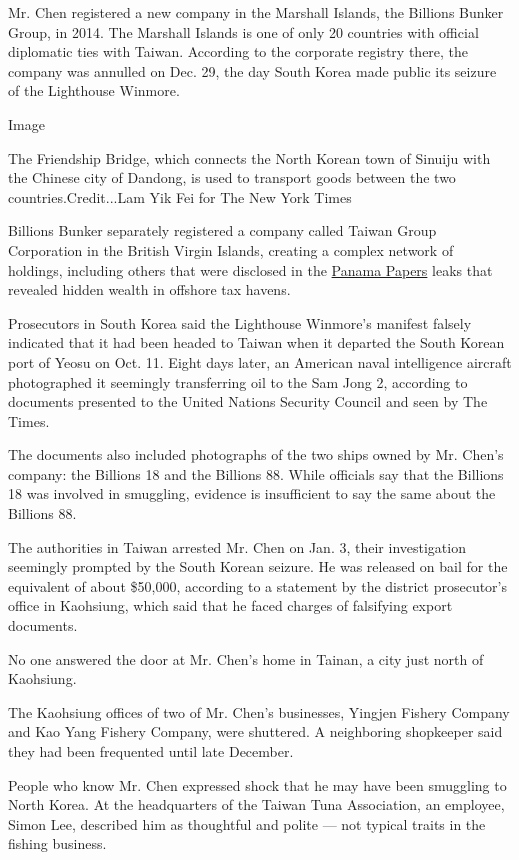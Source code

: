Mr. Chen registered a new company in the Marshall Islands, the Billions
Bunker Group, in 2014. The Marshall Islands is one of only 20 countries
with official diplomatic ties with Taiwan. According to the corporate
registry there, the company was annulled on Dec. 29, the day South Korea
made public its seizure of the Lighthouse Winmore.

Image

The Friendship Bridge, which connects the North Korean town of Sinuiju
with the Chinese city of Dandong, is used to transport goods between the
two countries.Credit...Lam Yik Fei for The New York Times

Billions Bunker separately registered a company called Taiwan Group
Corporation in the British Virgin Islands, creating a complex network of
holdings, including others that were disclosed in the
\href{https://www.nytimes3xbfgragh.onion/2016/04/05/world/panama-papers-explainer.html}{Panama
Papers} leaks that revealed hidden wealth in offshore tax havens.

Prosecutors in South Korea said the Lighthouse Winmore's manifest
falsely indicated that it had been headed to Taiwan when it departed the
South Korean port of Yeosu on Oct. 11. Eight days later, an American
naval intelligence aircraft photographed it seemingly transferring oil
to the Sam Jong 2, according to documents presented to the United
Nations Security Council and seen by The Times.

The documents also included photographs of the two ships owned by Mr.
Chen's company: the Billions 18 and the Billions 88. While officials say
that the Billions 18 was involved in smuggling, evidence is insufficient
to say the same about the Billions 88.

The authorities in Taiwan arrested Mr. Chen on Jan. 3, their
investigation seemingly prompted by the South Korean seizure. He was
released on bail for the equivalent of about \$50,000, according to a
statement by the district prosecutor's office in Kaohsiung, which said
that he faced charges of falsifying export documents.

No one answered the door at Mr. Chen's home in Tainan, a city just north
of Kaohsiung.

The Kaohsiung offices of two of Mr. Chen's businesses, Yingjen Fishery
Company and Kao Yang Fishery Company, were shuttered. A neighboring
shopkeeper said they had been frequented until late December.

People who know Mr. Chen expressed shock that he may have been smuggling
to North Korea. At the headquarters of the Taiwan Tuna Association, an
employee, Simon Lee, described him as thoughtful and polite --- not
typical traits in the fishing business.

